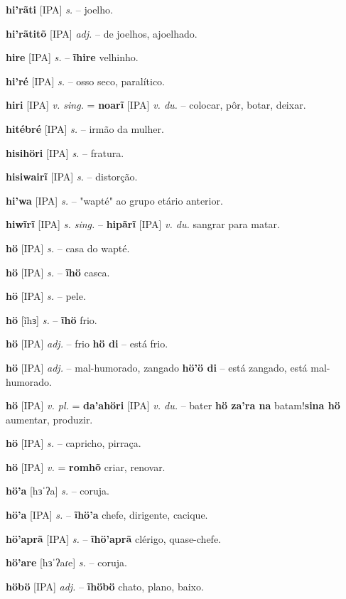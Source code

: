 \textbf{hi'rãti} [IPA] \textit{s.} -- joelho.

\textbf{hi'rãtitõ} [IPA] \textit{adj.} -- de joelhos, ajoelhado.

\textbf{hire} [IPA] \textit{s.} -- \textbf{ĩhire} velhinho.

\textbf{hi'ré} [IPA] \textit{s.} -- osso seco, paralítico.

\textbf{hiri} [IPA] \textit{v. sing.} = \textbf{noarĩ} [IPA] \textit{v. du.} -- colocar, pôr, botar, deixar.

\textbf{hitébré} [IPA] \textit{s.} -- irmão da mulher.

\textbf{hisihöri} [IPA] \textit{s.} -- fratura.

\textbf{hisiwairĩ} [IPA] \textit{s.} -- distorção.

\textbf{hi'wa} [IPA] \textit{s.} -- "wapté" ao grupo etário anterior.

\textbf{hiwĩrĩ} [IPA] \textit{s. sing.} -- \textbf{hipãrĩ} [IPA] \textit{v. du.} sangrar para matar.

\textbf{hö} [IPA] \textit{s.} -- casa do wapté.

\textbf{hö} [IPA] \textit{s.} -- \textbf{ĩhö} casca.

\textbf{hö} [IPA] \textit{s.} -- pele.

\textbf{hö} [ĩhɜ] \textit{s.} -- \textbf{ĩhö} frio.

\textbf{hö} [IPA] \textit{adj.} -- frio  \textbf{hö di} -- está frio.

\textbf{hö} [IPA] \textit{adj.} -- mal-humorado, zangado  \textbf{hö'ö di} -- está zangado, está mal-humorado.

\textbf{hö} [IPA] \textit{v. pl.} = \textbf{da'ahöri} [IPA] \textit{v. du.} -- bater  \textbf{hö za'ra na} batam!\textbf{sina hö} aumentar, produzir.

\textbf{hö} [IPA] \textit{s.} -- capricho, pirraça.

\textbf{hö} [IPA] \textit{v.} = \textbf{romhõ} criar, renovar.

\textbf{hö'a} [hɜˈʔa] \textit{s.} -- coruja.

\textbf{hö'a} [IPA] \textit{s.} -- \textbf{ĩhö'a} chefe, dirigente, cacique.

\textbf{hö'aprã} [IPA] \textit{s.} -- \textbf{ĩhö'aprã} clérigo, quase-chefe.

\textbf{hö'are} [hɜˈʔaɾe] \textit{s.} -- coruja.

\textbf{höbö} [IPA] \textit{adj.} -- \textbf{ĩhöbö} chato, plano, baixo.

